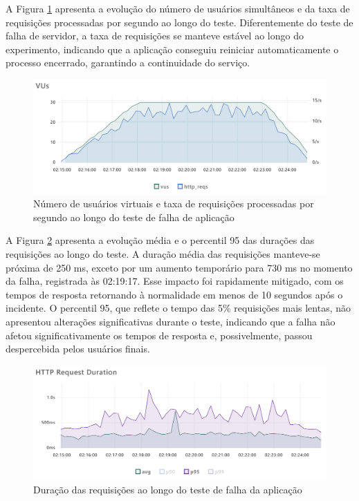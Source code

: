 A Figura \ref{fig:process-failing-vus-and-reqs} apresenta a evolução do número de usuários simultâneos e da taxa de requisições processadas por segundo ao longo do teste. Diferentemente do teste de falha de servidor, a taxa de requisições se manteve estável ao longo do experimento, indicando que a aplicação conseguiu reiniciar automaticamente o processo encerrado, garantindo a continuidade do serviço.

\begin{figure}[H]
    \centering
    \includegraphics[width=1\textwidth]{assets/process-failing-test/vus-and-reqs.png}
    \caption{Número de usuários virtuais e taxa de requisições processadas por segundo ao longo do teste de falha de aplicação}
    \label{fig:process-failing-vus-and-reqs}
\end{figure}

A Figura \ref{fig:process-failing-req-duration} apresenta a evolução média e o percentil 95 das durações das requisições ao longo do teste. A duração média das requisições manteve-se próxima de 250 ms, exceto por um aumento temporário para 730 ms no momento da falha, registrada às 02:19:17. Esse impacto foi rapidamente mitigado, com os tempos de resposta retornando à normalidade em menos de 10 segundos após o incidente. O percentil 95, que reflete o tempo das 5\% requisições mais lentas, não apresentou alterações significativas durante o teste, indicando que a falha não afetou significativamente os tempos de resposta e, possivelmente, passou despercebida pelos usuários finais.

\begin{figure}[H]
    \centering
    \includegraphics[width=1\textwidth]{assets/process-failing-test/req-duration.png}
    \caption{Duração das requisições ao longo do teste de falha da aplicação}
    \label{fig:process-failing-req-duration}
\end{figure}

